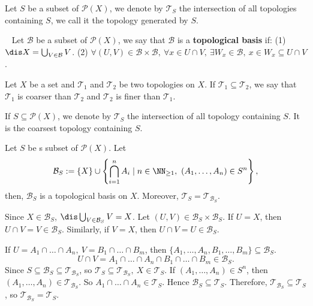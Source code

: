 \begin{definitionenv}
    Let $S$ be a subset of $\mathscr{P}(X)$, we denote by $\mathscr{T}_S$ the intersection of all topologies containing $S$, we call it the topology generated by $S$. 
\end{definitionenv}
\begin{definitionenv}
    \ \newline
    Let $\mathcal{B}$ be a subset of $\mathscr{P}(X)$, we say that $\mathcal{B}$ is a \textbf{topological basis} if:
    \newline
    (1) $\dis X=\bigcup_{V\in \mathcal{B}}V$.
    \newline
    (2) $\forall (U,V)\in \mathcal{B}\times\mathcal{B},\ \forall x\in U\cap V,\ \exists W_x\in \mathcal{B},\ x\in W_x\subseteq U\cap V$.
\end{definitionenv}
\begin{definitionenv}
    Let $X$ be a set and $\mathscr{T}_1$ and $\mathscr{T}_2$ be two topologies on $X$. If $\mathscr{T}_1\subseteq\mathscr{T}_2$, we say that $\mathscr{T}_1$ is coarser than $\mathscr{T}_2$ and $\mathscr{T}_2$ is finer than $\mathscr{T}_1$. 
    
    If $S\subseteq\mathscr{P}(X)$, we denote by $\mathscr{T}_S$ the intersection of all topology containing $S$. It is the coarsest topology containing $S$. 
    
\end{definitionenv}
\begin{propositionenv}
    Let $S$ be s subset of $\mathscr{P}(X)$. Let 
    $$\mathcal{B}_S:=\{X\}\cup\left\{\bigcap_{i=1}^{n}A_i\mid n\in \NN_{\ge 1},\ (A_1,\dots,A_n)\in S^n\right\},$$
    then, $\mathcal{B}_S$ is a topological basis on $X$. Moreover, $\mathscr{T}_S=\mathscr{T}_{\mathcal{B}_S}$.
\end{propositionenv}
\begin{proofenv}
    Since $X\in \mathcal{B}_S$, $\dis\bigcup_{V\in \mathcal{B}_S}V=X$. Let $(U,V)\in \mathcal{B}_S\times\mathcal{B}_S$. If $U=X$, then $U\cap V=V\in \mathcal{B}_S$. Similarly, if $V=X$, then $U\cap V=U\in \mathcal{B}_S$. 

    If $U=A_1\cap\dots\cap A_n,\ V=B_1\cap\dots\cap B_m$, then $\{A_1,\dots, A_n,B_1,\dots,B_m\}\subseteq \mathcal{B}_S$. 
    $$U\cap V=A_1\cap\dots\cap A_n\cap B_1\cap\dots\cap B_m\in \mathcal{B}_S.$$
    Since $S\subseteq\mathcal{B}_S\subseteq\mathscr{T}_{\mathcal{B}_S}$, so $\mathscr{T}_{S}\subseteq\mathscr{T}_{\mathcal{B}_S}, \ X\in \mathscr{T}_S$. If $(A_1,\dots,A_n)\in S^n$, then $(A_1,\dots,A_n)\in\mathscr{T}_{\mathcal{B}_S}$. So $A_1\cap\dots\cap A_n\in \mathscr{T}_S$. Hence $\mathcal{B}_S\subseteq\mathscr{T}_{S}$. Therefore, $\mathscr{T}_{\mathcal{B}_S}\subseteq\mathscr{T}_S$, so $\mathscr{T}_{\mathcal{B}_S}=\mathscr{T}_S$.
\end{proofenv}
